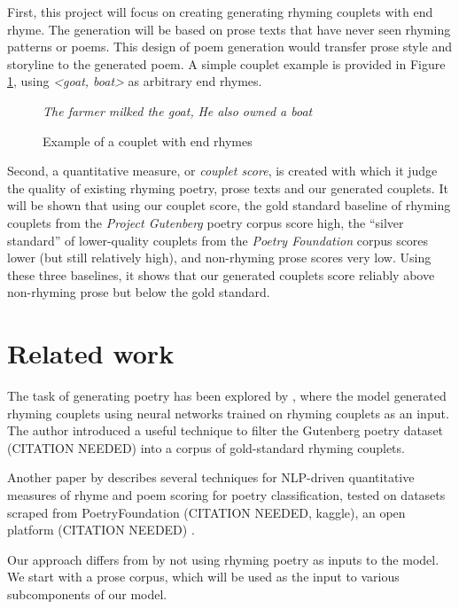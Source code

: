 \documentclass[11pt,a4paper]{article}
\begin{document}
First, this project will focus on creating generating rhyming couplets with end rhyme. The generation will be based on prose texts that have never seen rhyming patterns or poems. This design of poem generation would transfer prose style and storyline to the generated poem. A simple couplet example is provided in Figure \ref{fig:couplet_example}, using \textit{<goat, boat>} as arbitrary end rhymes.

\begin{figure}
	\textit{The farmer milked the goat,} \newline
	\textit{He also owned a boat}
\caption{Example of a couplet with end rhymes}
\label{fig:couplet_example}
\end{figure}

Second, a quantitative measure, or \textit{couplet score}, is created with which it judge the quality of existing rhyming poetry, prose texts and our generated couplets. It will be shown that using our couplet score, the gold standard baseline of rhyming couplets from the \textit{Project Gutenberg} poetry corpus score high, the ``silver standard'' of lower-quality couplets from the \textit{Poetry Foundation} corpus scores lower (but still relatively high), and non-rhyming prose scores very low. Using these three baselines, it shows that our generated couplets score reliably above non-rhyming prose but below the gold standard.

\section{Related work}
The task of generating poetry has been explored by \citet{cole}, where the model generated rhyming couplets using neural networks trained on rhyming couplets as an input. The author introduced a useful technique to filter the Gutenberg poetry dataset (CITATION NEEDED) into a corpus of gold-standard rhyming couplets.

Another paper by \citet{keswarani} describes several techniques for NLP-driven quantitative measures of rhyme and poem scoring for poetry classification, tested on datasets scraped from PoetryFoundation (CITATION NEEDED, kaggle), an open platform (CITATION NEEDED) .

Our approach differs from \citet{cole} by not using rhyming poetry as inputs to the model. We start with a prose corpus, which will be used as the input to various subcomponents of our model.

\end{document}
